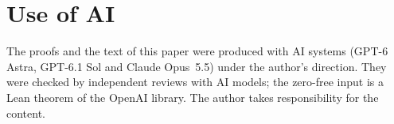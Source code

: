 \documentclass[11pt]{article}
\theoremstyle{definition}
\theoremstyle{remark}
\begin{document}


\section*{Use of AI}
The proofs and the text of this paper were produced with AI systems (GPT-6 Astra, GPT-6.1 Sol and Claude
Opus~5.5) under the author's direction. They were checked by independent reviews with AI models; the
zero-free input is a Lean theorem of the OpenAI library. The author takes responsibility for the
content.
\end{document}
